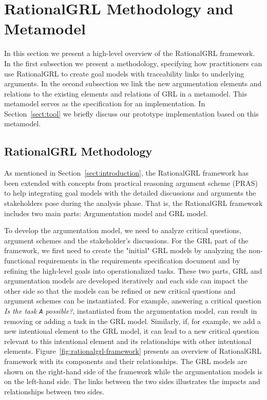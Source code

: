 \section{RationalGRL Methodology and Metamodel}
\label{sect:overview}

In this section we present a high-level overview of the RationalGRL framework. In the first subsection we present a methodology, specifying how practitioners can use RationalGRL to create goal models with traceability links to underlying arguments. In the second subsection we link the new argumentation elements and relations to the existing elements and relations of GRL in a metamodel. This metamodel serves as the specification for an implementation. In Section~\ref{sect:tool} we briefly discuss our prototype implementation based on this metamodel.

\subsection{RationalGRL Methodology} 

As mentioned in Section~\ref{sect:introduction}, the RationalGRL framework has been extended with concepts from practical reasoning argument scheme (PRAS) to help integrating goal models with the detailed discussions and arguments the stakeholders pose during the analysis phase. That is, the RationalGRL framework includes two main parts: Argumentation model and GRL model. 

To develop the argumentation model, we need to analyze critical questions, argument schemes and the stakeholder's discussions. For the GRL part of the framework, we first need to create the "initial" GRL models by analyzing the non-functional requirements in the requirements specification document and by refining the high-level goals into operationalized tasks. These two parts, GRL and argumentation models are developed iteratively and each side can impact the other side so that the models can be refined or new critical questions and argument schemes can be instantiated. For example, answering a critical question \emph{Is the task \texttt{A} possible?}, instantiated from the argumentation model, can result in removing or adding a task in the GRL model. Similarly,  if, for example, we add a new intentional element to the GRL model, it can lead to a new critical question relevant to this intentional element and its relationships with other intentional elements. Figure~\ref{fig:rationalgrl-framework} presents an overview of RationalGRL framework with its components and their relationships.  The GRL models  are shown  on the right-hand side of the framework while the argumentation models is on the left-hand side. The links between the two sides illustrates the impacts and relationships between two sides. 

